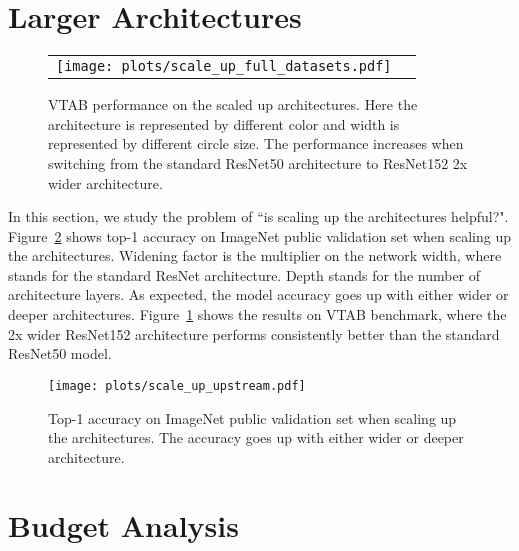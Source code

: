 \documentclass{article}
\newcommand{\imagenet}{ImageNet}
\begin{document}
\clearpage
\section{Larger Architectures\label{app:scale-architecture}}

\begin{minipage}{\textwidth}
\begin{figure}[H]
    \centering
    \begin{tabular}{cc}
    \texttt{[image: plots/scale\_up\_full\_datasets.pdf]}
    \end{tabular}
    \caption{
    VTAB performance on the scaled up architectures.
    Here the architecture is represented by different color and width is represented by different circle size.
    The performance increases when switching from the standard ResNet50 architecture to ResNet152 2x wider architecture.}
    \label{fig:scale-up-downstream}
\end{figure}
\end{minipage}

In this section, we study the problem of ``is scaling up the architectures helpful?". Figure~\ref{fig:scale-up-upstream} shows top-1 accuracy on \imagenet{} public validation set when scaling up the architectures. 
Widening factor is the multiplier on the network width, where  stands for the standard ResNet architecture.
Depth stands for the number of architecture layers. 
As expected, the model accuracy goes up with either wider or deeper architectures. 
Figure~\ref{fig:scale-up-downstream} shows the results on VTAB benchmark, where the 2x wider ResNet152 architecture performs consistently better than the standard ResNet50 model. 

\begin{figure}[ht]
    \centering
    \texttt{[image: plots/scale\_up\_upstream.pdf]}
    \caption{Top-1 accuracy on \imagenet{} public validation set when scaling up the architectures. The accuracy goes up with either wider or deeper architecture. 
    }
    \label{fig:scale-up-upstream}
\end{figure}




\clearpage
\section{Budget Analysis\label{app:budget}}
\end{document}
